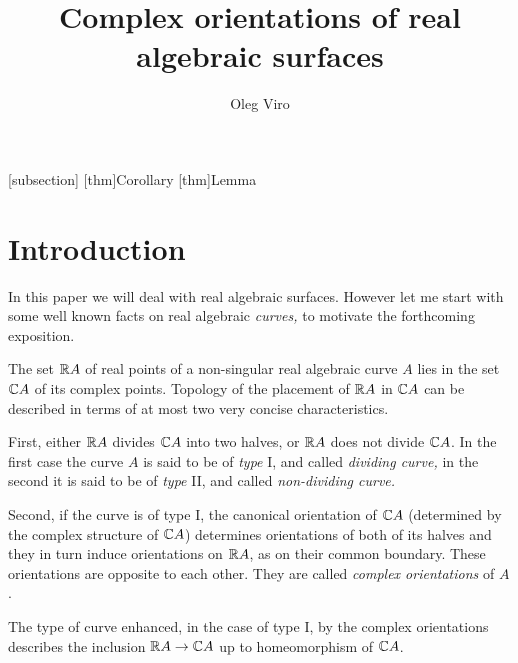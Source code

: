 \documentclass{article}
\numberwithin{equation}{section}
\begin{document}
[subsection]{\bf}{\it}
\renewcommand{\thethm}{\protect{\thesubsection.\Alph{thm}\/}}
[thm]{Corollary}{\bf}{\it}
[thm]{Lemma}{\bf}{\it}




\title{Complex orientations of real algebraic surfaces}
\author{Oleg Viro}
\date{}
\maketitle


\section{Introduction}\label{s0}

In this paper we will deal with {\sfit real algebraic surfaces\/}. However let
me start with some well known facts on real algebraic {\it curves,\/}
to motivate the forthcoming exposition.

The set $\mathbb R A$ of real points of a non-singular real algebraic curve $A$
lies in the set $\mathbb C A$ of its complex points.
Topology of the placement of $\mathbb R A$ in $\mathbb C A$ can be
described in terms of at most two very concise characteristics.

First,  either $\mathbb R A$
divides $\mathbb C A$ into two halves, or $\mathbb R A$ does not divide $\mathbb C A$. In the first
case the curve $A$ is said to be of {\it type\/} I, and called {\it
dividing curve,\/} in the second it is said to be of {\it type\/} II, and
called {\it non-dividing curve.\/}

Second, if the curve is of type I, the canonical orientation of $\mathbb C A$
(determined by the complex structure of $\mathbb C A$)
determines orientations of both of its halves and they in turn induce
orientations on $\mathbb R A$, as on their common boundary. These orientations
are opposite to each other. They are called {\it complex
orientations\/} of $A$.

The type of curve enhanced, in the case of type I, by the complex
orientations describes the inclusion $\mathbb R A\to\mathbb C A$ up to homeomorphism of
$\mathbb C A$.
\end{document}
